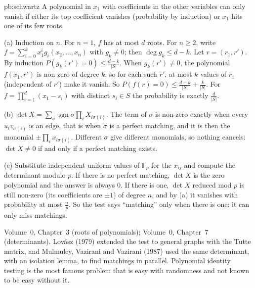 \begin{solution}{pb:schwartz}
\idea A polynomial in $x_1$ with coefficients in the other variables can only vanish if either its top coefficient vanishes
(probability by induction) or $x_1$ hits one of its few roots.

\writeup (a) Induction on $n$. For $n=1$, $f$ has at most $d$ roots. For $n\ge2$, write $f=\sum_{i=0}^kx_1^ig_i(x_2,\dots,x_n)$ with
$g_k\ne0$; then $\deg g_k\le d-k$. Let $r=(r_1,r')$. By induction $P(g_k(r')=0)\le\frac{d-k}{|S|}$. When $g_k(r')\ne0$, the polynomial
$f(x_1,r')$ is non-zero of degree $k$, so for each such $r'$, at most $k$ values of $r_1$ (independent of $r'$) make it vanish.
So $P(f(r)=0)\le\frac{d-k}{|S|}+\frac k{|S|}$. For $f=\prod_{i=1}^d(x_1-s_i)$ with distinct $s_i\in S$ the probability is exactly
$\frac d{|S|}$.

(b) $\det X=\sum_\sigma\operatorname{sgn}\sigma\prod_iX_{i\sigma(i)}$. The term of $\sigma$ is non-zero exactly when every
$u_iv_{\sigma(i)}$ is an edge, that is when $\sigma$ is a perfect matching, and it is then the monomial $\pm\prod_ix_{i\sigma(i)}$.
Different $\sigma$ give different monomials, so nothing cancels: $\det X\ne0$ if and only if a perfect matching exists.

(c) Substitute independent uniform values of $\mathbb F_p$ for the $x_{ij}$ and compute the determinant modulo $p$. If there is no
perfect matching, $\det X$ is the zero polynomial and the answer is always $0$. If there is one, $\det X$ reduced mod $p$ is still
non-zero (its coefficients are $\pm1$) of degree $n$, and by (a) it vanishes with probability at most $\frac np$. So the test
says ``matching'' only when there is one: it can only miss matchings.

\tools Volume~0, Chapter~3 (roots of polynomials); Volume~0, Chapter~7 (determinants).
\leads Lovász (1979) extended the test to general graphs with the Tutte matrix, and Mulmuley, Vazirani and Vazirani (1987) used
the same determinant, with an isolation lemma, to find matchings in parallel. Polynomial identity testing is the most famous
problem that is easy with randomness and not known to be easy without it.
\end{solution}

